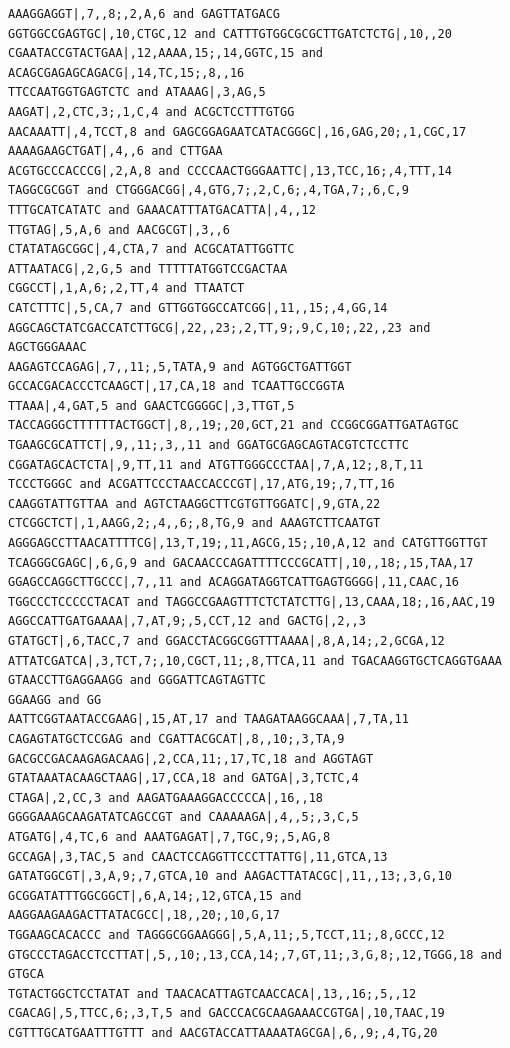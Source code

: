 \documentclass[a4paper,12pt,twoside,BCOR=10mm]{scrbook}
\begin{document}
\begin{lstlisting}
AAAGGAGGT|,7,,8;,2,A,6 and GAGTTATGACG
GGTGGCCGAGTGC|,10,CTGC,12 and CATTTGTGGCGCGCTTGATCTCTG|,10,,20
CGAATACCGTACTGAA|,12,AAAA,15;,14,GGTC,15 and ACAGCGAGAGCAGACG|,14,TC,15;,8,,16
TTCCAATGGTGAGTCTC and ATAAAG|,3,AG,5
AAGAT|,2,CTC,3;,1,C,4 and ACGCTCCTTTGTGG
AACAAATT|,4,TCCT,8 and GAGCGGAGAATCATACGGGC|,16,GAG,20;,1,CGC,17
AAAAGAAGCTGAT|,4,,6 and CTTGAA
ACGTGCCCACCCG|,2,A,8 and CCCCAACTGGGAATTC|,13,TCC,16;,4,TTT,14
TAGGCGCGGT and CTGGGACGG|,4,GTG,7;,2,C,6;,4,TGA,7;,6,C,9
TTTGCATCATATC and GAAACATTTATGACATTA|,4,,12
TTGTAG|,5,A,6 and AACGCGT|,3,,6
CTATATAGCGGC|,4,CTA,7 and ACGCATATTGGTTC
ATTAATACG|,2,G,5 and TTTTTATGGTCCGACTAA
CGGCCT|,1,A,6;,2,TT,4 and TTAATCT
CATCTTTC|,5,CA,7 and GTTGGTGGCCATCGG|,11,,15;,4,GG,14
AGGCAGCTATCGACCATCTTGCG|,22,,23;,2,TT,9;,9,C,10;,22,,23 and AGCTGGGAAAC
AAGAGTCCAGAG|,7,,11;,5,TATA,9 and AGTGGCTGATTGGT
GCCACGACACCCTCAAGCT|,17,CA,18 and TCAATTGCCGGTA
TTAAA|,4,GAT,5 and GAACTCGGGGC|,3,TTGT,5
TACCAGGGCTTTTTTACTGGCT|,8,,19;,20,GCT,21 and CCGGCGGATTGATAGTGC
TGAAGCGCATTCT|,9,,11;,3,,11 and GGATGCGAGCAGTACGTCTCCTTC
CGGATAGCACTCTA|,9,TT,11 and ATGTTGGGCCCTAA|,7,A,12;,8,T,11
TCCCTGGGC and ACGATTCCCTAACCACCCGT|,17,ATG,19;,7,TT,16
CAAGGTATTGTTAA and AGTCTAAGGCTTCGTGTTGGATC|,9,GTA,22
CTCGGCTCT|,1,AAGG,2;,4,,6;,8,TG,9 and AAAGTCTTCAATGT
AGGGAGCCTTAACATTTTCG|,13,T,19;,11,AGCG,15;,10,A,12 and CATGTTGGTTGT
TCAGGGCGAGC|,6,G,9 and GACAACCCAGATTTTCCCGCATT|,10,,18;,15,TAA,17
GGAGCCAGGCTTGCCC|,7,,11 and ACAGGATAGGTCATTGAGTGGGG|,11,CAAC,16
TGGCCCTCCCCCTACAT and TAGGCCGAAGTTTCTCTATCTTG|,13,CAAA,18;,16,AAC,19
AGGCCATTGATGAAAA|,7,AT,9;,5,CCT,12 and GACTG|,2,,3
GTATGCT|,6,TACC,7 and GGACCTACGGCGGTTTAAAA|,8,A,14;,2,GCGA,12
ATTATCGATCA|,3,TCT,7;,10,CGCT,11;,8,TTCA,11 and TGACAAGGTGCTCAGGTGAAA
GTAACCTTGAGGAAGG and GGGATTCAGTAGTTC
GGAAGG and GG
AATTCGGTAATACCGAAG|,15,AT,17 and TAAGATAAGGCAAA|,7,TA,11
CAGAGTATGCTCCGAG and CGATTACGCAT|,8,,10;,3,TA,9
GACGCCGACAAGAGACAAG|,2,CCA,11;,17,TC,18 and AGGTAGT
GTATAAATACAAGCTAAG|,17,CCA,18 and GATGA|,3,TCTC,4
CTAGA|,2,CC,3 and AAGATGAAAGGACCCCCA|,16,,18
GGGGAAAGCAAGATATCAGCCGT and CAAAAAGA|,4,,5;,3,C,5
ATGATG|,4,TC,6 and AAATGAGAT|,7,TGC,9;,5,AG,8
GCCAGA|,3,TAC,5 and CAACTCCAGGTTCCCTTATTG|,11,GTCA,13
GATATGGCGT|,3,A,9;,7,GTCA,10 and AAGACTTATACGC|,11,,13;,3,G,10
GCGGATATTTGGCGGCT|,6,A,14;,12,GTCA,15 and AAGGAAGAAGACTTATACGCC|,18,,20;,10,G,17
TGGAAGCACACCC and TAGGGCGGAAGGG|,5,A,11;,5,TCCT,11;,8,GCCC,12
GTGCCCTAGACCTCCTTAT|,5,,10;,13,CCA,14;,7,GT,11;,3,G,8;,12,TGGG,18 and GTGCA
TGTACTGGCTCCTATAT and TAACACATTAGTCAACCACA|,13,,16;,5,,12
CGACAG|,5,TTCC,6;,3,T,5 and GACCCACGCAAGAAACCGTGA|,10,TAAC,19
CGTTTGCATGAATTTGTTT and AACGTACCATTAAAATAGCGA|,6,,9;,4,TG,20

\end{lstlisting}
\end{document}
